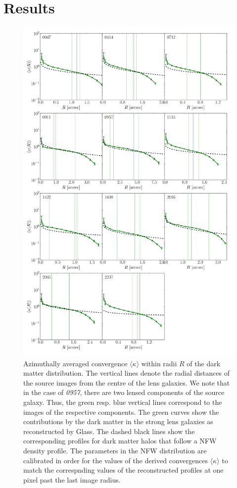 \documentclass[useAMS,usenatbib]{mn2e}
\def\Glass{{\sc Glass}}
\begin{document}
\section{Results}\label{sec:results}
\begin{figure}
  \centering
  \includegraphics[width=.75\linewidth]{Figures/kappaplot.pdf}
  \caption[width=\linewidth]{Azimuthally averaged convergence $\langle\kappa\rangle$ within radii $R$ of the dark matter distribution. The vertical lines denote the radial distances of the source images from the centre of the lens galaxies. We note that in the case of \textit{0957}, there are two lensed components of the source galaxy. Thus, the green resp. blue vertical lines correspond to the images of the respective components. The green curves show the contributions by the dark matter in the strong lens galaxies as reconstructed by \Glass. The dashed black lines show the corresponding profiles for dark matter halos that follow a NFW density profile. The parameters in the NFW distribution are calibrated in order for the values of the derived convergences $\langle\kappa\rangle$ to match the correspnding values of the reconstructed profiles at one pixel past the last image radius.}
  \label{fig:kappaplot}
\end{figure}
\end{document}
